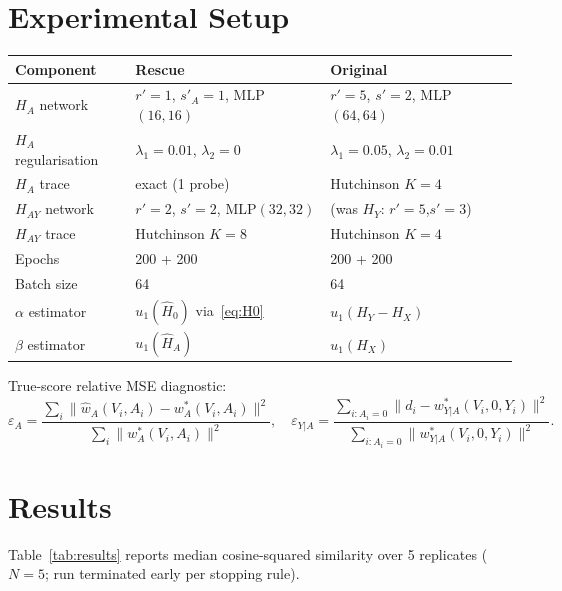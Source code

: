\documentclass[11pt]{article}
\begin{document}
\section{Experimental Setup}
\label{sec:setup}

\begin{center}
\begin{tabular}{lll}
\toprule
Component & Rescue & Original\\
\midrule
$H_A$ network & $r'=1$, $s'_A=1$, MLP$(16,16)$ & $r'=5$, $s'=2$, MLP$(64,64)$\\
$H_A$ regularisation & $\lambda_1=0.01$, $\lambda_2=0$ & $\lambda_1=0.05$, $\lambda_2=0.01$\\
$H_A$ trace & exact (1 probe) & Hutchinson $K=4$\\
$H_{AY}$ network & $r'=2$, $s'=2$, MLP$(32,32)$ & (was $H_Y$: $r'=5$,$s'=3$)\\
$H_{AY}$ trace & Hutchinson $K=8$ & Hutchinson $K=4$\\
Epochs & 200 + 200 & 200 + 200\\
Batch size & 64 & 64\\
$\alpha$ estimator & $u_1(\hat H_0)$ via~\eqref{eq:H0} & $u_1(H_Y-H_X)$\\
$\beta$ estimator & $u_1(\hat H_A)$ & $u_1(H_X)$\\
\bottomrule
\end{tabular}
\end{center}

True-score relative MSE diagnostic:
\[
\varepsilon_A = \frac{\sum_i\|\hat w_A(V_i,A_i)-w_A^*(V_i,A_i)\|^2}
                     {\sum_i\|w_A^*(V_i,A_i)\|^2},\quad
\varepsilon_{Y|A} = \frac{\sum_{i:A_i=0}\|d_i-w_{Y|A}^*(V_i,0,Y_i)\|^2}
                        {\sum_{i:A_i=0}\|w_{Y|A}^*(V_i,0,Y_i)\|^2}.
\]

\section{Results}
\label{sec:results}

Table~\ref{tab:results} reports median cosine-squared similarity over 5 replicates
($N=5$; run terminated early per stopping rule).
\end{document}
